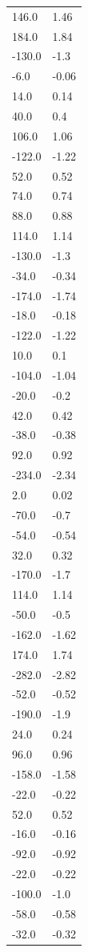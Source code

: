 \begin{longtable}{ll}
146.0 & 1.46 \\
184.0 & 1.84 \\
-130.0 & -1.3 \\
-6.0 & -0.06 \\
14.0 & 0.14 \\
40.0 & 0.4 \\
106.0 & 1.06 \\
-122.0 & -1.22 \\
52.0 & 0.52 \\
74.0 & 0.74 \\
88.0 & 0.88 \\
114.0 & 1.14 \\
-130.0 & -1.3 \\
-34.0 & -0.34 \\
-174.0 & -1.74 \\
-18.0 & -0.18 \\
-122.0 & -1.22 \\
10.0 & 0.1 \\
-104.0 & -1.04 \\
-20.0 & -0.2 \\
42.0 & 0.42 \\
-38.0 & -0.38 \\
92.0 & 0.92 \\
-234.0 & -2.34 \\
2.0 & 0.02 \\
-70.0 & -0.7 \\
-54.0 & -0.54 \\
32.0 & 0.32 \\
-170.0 & -1.7 \\
114.0 & 1.14 \\
-50.0 & -0.5 \\
-162.0 & -1.62 \\
174.0 & 1.74 \\
-282.0 & -2.82 \\
-52.0 & -0.52 \\
-190.0 & -1.9 \\
24.0 & 0.24 \\
96.0 & 0.96 \\
-158.0 & -1.58 \\
-22.0 & -0.22 \\
52.0 & 0.52 \\
-16.0 & -0.16 \\
-92.0 & -0.92 \\
-22.0 & -0.22 \\
-100.0 & -1.0 \\
-58.0 & -0.58 \\
-32.0 & -0.32 \\

\end{longtable}
